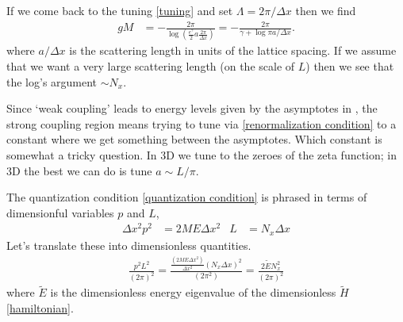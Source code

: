 If we come back to the tuning \eqref{tuning} and set $\Lambda=2\pi/\Delta x$ then we find
\begin{align}
	gM
	&= - \frac{2\pi}{\log\left(\frac{e^\gamma}{2} a \frac{2\pi}{\Delta x}\right)}
	= -\frac{2\pi}{\gamma + \log \pi a / \Delta x}.
\end{align}
where $a/\Delta x$ is the scattering length in units of the lattice spacing.
If we assume that we want a very large scattering length (on the scale of $L$) then we see that the log's argument $\sim N_x$.

Since `weak coupling' leads to energy levels given by the asymptotes in , the strong coupling region means trying to tune via \eqref{renormalization condition} to a constant where we get something between the asymptotes.
Which constant is somewhat a tricky question.
In 3D we tune to the zeroes of the zeta function; in 3D the best we can do is tune $a \sim L/\pi$.

The quantization condition \eqref{quantization condition} is phrased in terms of dimensionful variables $p$ and $L$,
\begin{align}
	\Delta x^2 p^2 &= 2 M E \Delta x^2
	&
	L &= N_x \Delta x
\end{align}
Let's translate these into dimensionless quantities.
\begin{align}
	\frac{p^2 L^2}{(2\pi)^2}
	=
	\frac{ \frac{(2 M E \Delta x^2)}{\Delta x^2} (N_x \Delta x)^2}{(2\pi^2)}
	=
	\frac{ 2 \tilde{E} N_x^2 }{(2\pi)^2}
\end{align}
where $\tilde{E}$ is the dimensionless energy eigenvalue of the dimensionless $\tilde{H}$ \eqref{hamiltonian}.
